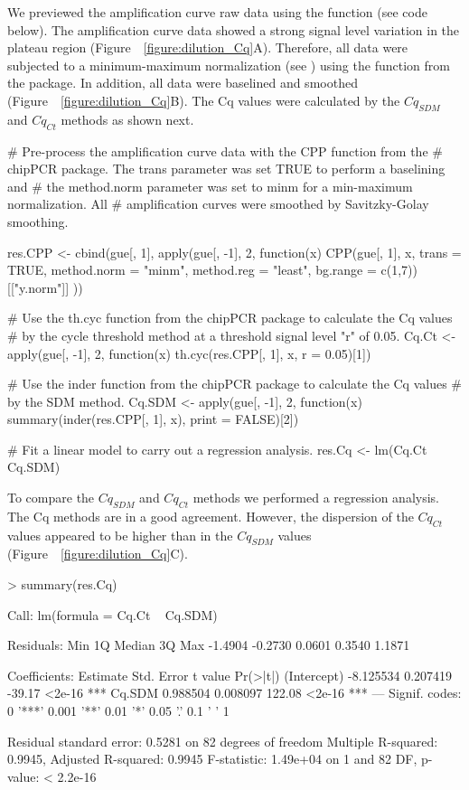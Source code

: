 We previewed the amplification curve raw data using the  
function (see code below). The amplification curve data showed a strong signal 
level variation in the plateau region (Figure~~\ref{figure:dilution_Cq}A). 
Therefore, all data were subjected to a minimum-maximum normalization (see 
\citet{roediger_RJ_2013}) using the  function from the 
 package. In addition, all data were baselined and smoothed 
(Figure~~\ref{figure:dilution_Cq}B). The Cq values were calculated by the 
$Cq_{SDM}$ and $Cq_{Ct}$ methods as shown next.

\begin{example}
# Pre-process the amplification curve data with the CPP function from the 
# chipPCR package. The trans parameter was set TRUE to perform a baselining and 
# the method.norm parameter was set to minm for a min-maximum normalization. All
# amplification curves were smoothed by Savitzky-Golay smoothing.

res.CPP <- cbind(gue[, 1], apply(gue[, -1], 2, function(x) {
  CPP(gue[, 1], x, trans = TRUE, method.norm = "minm", method.reg = "least",
      bg.range = c(1,7))[["y.norm"]]
}))

# Use the th.cyc function from the chipPCR package to calculate the Cq values
# by the cycle threshold method at a threshold signal level "r" of 0.05.
Cq.Ct <- apply(gue[, -1], 2, function(x) 
  th.cyc(res.CPP[, 1], x, r = 0.05)[1])

# Use the inder function from the chipPCR package to calculate the Cq values
# by the SDM method.
Cq.SDM <- apply(gue[, -1], 2, function(x)
  summary(inder(res.CPP[, 1], x), print = FALSE)[2])

# Fit a linear model to carry out a regression analysis.
res.Cq <- lm(Cq.Ct ~ Cq.SDM)
\end{example}

To compare the $Cq_{SDM}$ and $Cq_{Ct}$ methods we performed a regression 
analysis. The Cq methods are in a good agreement. However, the dispersion of 
the 
$Cq_{Ct}$ values appeared to be higher than in the $Cq_{SDM}$ values 
(Figure~~\ref{figure:dilution_Cq}C).

\begin{example}
> summary(res.Cq)

Call:
lm(formula = Cq.Ct ~ Cq.SDM)

Residuals:
    Min      1Q  Median      3Q     Max 
-1.4904 -0.2730  0.0601  0.3540  1.1871 

Coefficients:
             Estimate Std. Error t value Pr(>|t|)    
(Intercept) -8.125534   0.207419  -39.17   <2e-16 ***
Cq.SDM       0.988504   0.008097  122.08   <2e-16 ***
---
Signif. codes:  0 '***' 0.001 '**' 0.01 '*' 0.05 '.' 0.1 ' ' 1

Residual standard error: 0.5281 on 82 degrees of freedom
Multiple R-squared:  0.9945,  Adjusted R-squared:  0.9945 
F-statistic: 1.49e+04 on 1 and 82 DF,  p-value: < 2.2e-16
\end{example}

